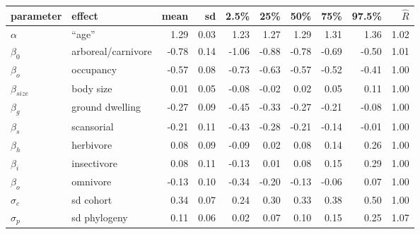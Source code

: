 \documentclass{article}
\begin{document}
\begin{table}[c]
  \centering
  \begin{tabular}{ l l r r r r r r r r }
    parameter & effect & mean & sd & 2.5\% & 25\% & 50\% & 75\% & 97.5\% & \(\hat{R}\) \\ 
    \hline
    \(\alpha\) & ``age'' &1.29 & 0.03 & 1.23 & 1.27 & 1.29 & 1.31 & 1.36 & 1.02 \\ 
    \hline
    \(\beta_{0}\) & arboreal/carnivore & -0.78 & 0.14 & -1.06 & -0.88 & -0.78 & -0.69 & -0.50 & 1.01 \\ 
    \(\beta_{o}\) & occupancy & -0.57 & 0.08 & -0.73 & -0.63 & -0.57 & -0.52 & -0.41 & 1.00 \\ 
    \(\beta_{size}\) & body size & 0.01 & 0.05 & -0.08 & -0.02 & 0.02 & 0.05 & 0.11 & 1.00 \\ 
    \(\beta_{g}\) & ground dwelling & -0.27 & 0.09 & -0.45 & -0.33 & -0.27 & -0.21 & -0.08 & 1.00 \\ 
    \(\beta_{s}\) & scansorial & -0.21 & 0.11 & -0.43 & -0.28 & -0.21 & -0.14 & -0.01 & 1.00 \\ 
    \(\beta_{h}\) & herbivore & 0.08 & 0.09 & -0.09 & 0.02 & 0.08 & 0.14 & 0.26 & 1.00 \\ 
    \(\beta_{i}\) & insectivore & 0.08 & 0.11 & -0.13 & 0.01 & 0.08 & 0.15 & 0.29 & 1.00 \\ 
    \(\beta_{o}\) & omnivore & -0.13 & 0.10 & -0.34 & -0.20 & -0.13 & -0.06 & 0.07 & 1.00 \\ 
    \hline
    \(\sigma_{c}\) & sd cohort & 0.34 & 0.07 & 0.24 & 0.30 & 0.33 & 0.38 & 0.50 & 1.00 \\ 
    \(\sigma_{p}\) & sd phylogeny & 0.11 & 0.06 & 0.02 & 0.07 & 0.10 & 0.15 & 0.25 & 1.07 \\ 
    \hline
  \end{tabular}
\end{table}
\end{document}
